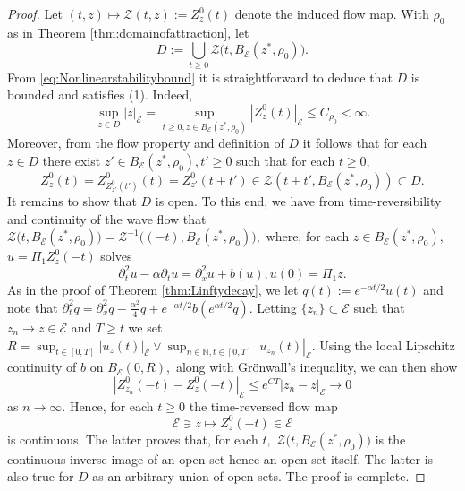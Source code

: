 \documentclass[10pt, reqno]{amsart}
\newcommand{\N}{\mathbb{N}}
\newcommand{\e}{\mathcal{E}}
\theoremstyle{definition}
\numberwithin{lem}{section}
\numberwithin{cor}{section}
\numberwithin{prop}{section}
\numberwithin{thm}{section}
\numberwithin{dfn}{section}
\begin{document}
\begin{proof} Let $(t,z)\longmapsto\mathcal{Z}(t,z):=Z^0_z(t)$ denote the induced flow map. With $\rho_0$ as in Theorem \ref{thm:domainofattraction}, let
\begin{equation}\label{eq:orbitDomain}
    D:=\bigcup_{t\geq 0} \mathcal{Z}\bigg(t,B_\e(z^*, \rho_0)\bigg).
\end{equation}
  From \eqref{eq:Nonlinearstabilitybound} it is straightforward to deduce that $D$ is bounded and satisfies (1). Indeed, 
$$\sup_{z\in D}|z|_\e=\sup_{t\geq 0, z\in B_\e(z^*,\rho_0)}|Z^0_z(t)|_\e\leq C_{\rho_0}<\infty.$$
Moreover, from the flow property and definition of $D$ it follows that for each $z\in D$ there exist $z'\in B_\e(z^*, \rho_0), t'\geq 0$ such that for each $t\geq 0,$ $$Z^0_z(t)=Z^0_{Z^0_{z'}(t')}(t)=Z^0_{z'}(t+t')\in\mathcal{Z}( t+t', B_\e(z^*, \rho_0))\subset D.$$ It remains to show that $D$ is open. To this end, we have from time-reversibility and continuity of the wave flow that $\mathcal{Z}\big(t,B_\e(z^*, \rho_0)\big)= \mathcal{Z}^{-1}\big((-t),B_\e(z^*, \rho_0)\big),$ where, for each $z\in B_\e(z^*, \rho_0), $ $u=\Pi_1Z^0_z(-t)$ solves 
$$\partial_t^2u-\alpha\partial_tu=\partial^2_xu+b(u), u(0)=\Pi_1z.     $$
As in the proof of Theorem \ref{thm:Linftydecay}, we let $q(t):=e^{-\alpha t/2}u(t)$ and note that $\partial^2_tq=\partial^2_xq-\tfrac{\alpha^2}{4}q+e^{-\alpha t/2}b(e^{\alpha t/2}q).$ Letting $\{z_n\}\subset\e$ such that $z_n\rightarrow z\in\e$ and $T\geq t$ we set $R=\sup_{t\in[0,T]}|u_z(t)|_{\e}\vee \sup_{n\in\N, t\in[0,T]}|u_{z_n}(t)|_{\e}.$ Using the local Lipschitz continuity of $b$ on $B_{\e}(0,R),$  along with Gr\"onwall's inequality, we can then show  
$$  |Z^0_{z_n}(-t)-Z^0_{z}(-t)|_{\e}\leq e^{CT}|z_n-z|_{\e}\rightarrow 0   $$
as $n\to\infty.$ Hence, for each $t
\geq 0$ the time-reversed flow map 
$$ \e\ni z\longmapsto Z^0_{z}(-t)\in\e      $$
is continuous. The latter proves that, for each $t,$ $\mathcal{Z}\big(t,B_\e(z^*, \rho_0)\big)$ is the continuous inverse image of an open set hence an open set itself. The latter is also true for $D$ as an arbitrary union of open sets. The proof is complete.
\end{proof}
\end{document}
